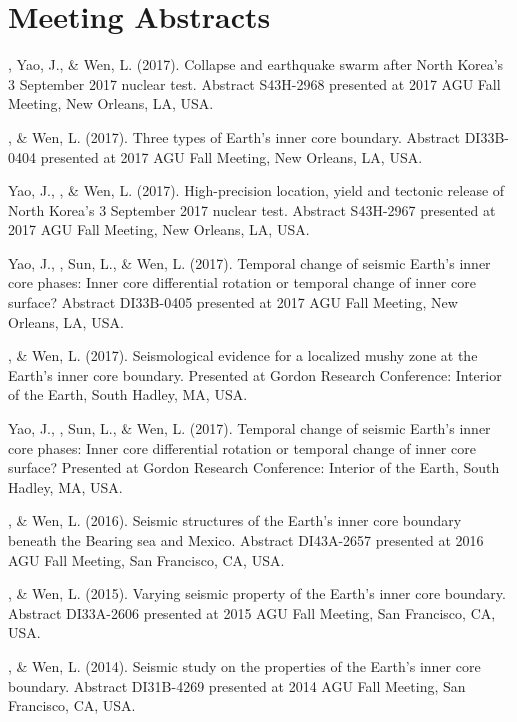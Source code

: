 \section*{Meeting Abstracts}
\begin{etaremune}
\item
    \Tian, Yao, J., \& Wen, L. (2017).
    Collapse and earthquake swarm after North Korea's 3 September 2017 nuclear test.
    Abstract S43H-2968 presented at 2017 AGU Fall Meeting, New Orleans, LA, USA.
\item
    \Tian, \& Wen, L. (2017).
    Three types of Earth's inner core boundary.
    Abstract DI33B-0404 presented at 2017 AGU Fall Meeting, New Orleans, LA, USA.
\item
    Yao, J., \Tian, \& Wen, L. (2017).
    High-precision location, yield and tectonic release of North Korea's 3 September 2017 nuclear test.
    Abstract S43H-2967 presented at 2017 AGU Fall Meeting, New Orleans, LA, USA.
\item
    Yao, J., \Tian, Sun, L., \& Wen, L. (2017).
    Temporal change of seismic Earth's inner core phases: Inner core differential rotation or temporal change of inner core surface?
    Abstract DI33B-0405 presented at 2017 AGU Fall Meeting, New Orleans, LA, USA.
\item
    \Tian, \& Wen, L. (2017).
    Seismological evidence for a localized mushy zone at the Earth's inner core boundary.
    Presented at Gordon Research Conference: Interior of the Earth, South Hadley, MA, USA.
\item
    Yao, J., \Tian, Sun, L., \& Wen, L. (2017).
    Temporal change of seismic Earth's inner core phases: Inner core differential rotation or temporal change of inner core surface?
    Presented at Gordon Research Conference: Interior of the Earth, South Hadley, MA, USA.
\item
    \Tian, \& Wen, L. (2016).
    Seismic structures of the Earth's inner core boundary beneath the Bearing sea and Mexico.
    Abstract DI43A-2657 presented at 2016 AGU Fall Meeting, San Francisco, CA, USA.
\item
    \Tian, \& Wen, L. (2015).
    Varying seismic property of the Earth's inner core boundary.
    Abstract DI33A-2606 presented at 2015 AGU Fall Meeting, San Francisco, CA, USA.
\item
    \Tian, \& Wen, L. (2014).
    Seismic study on the properties of the Earth's inner core boundary.
    Abstract DI31B-4269 presented at 2014 AGU Fall Meeting, San Francisco, CA, USA.
\item

\end{etaremune}
